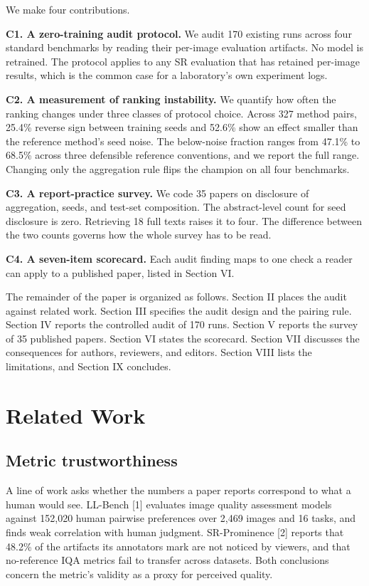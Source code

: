 \documentclass[journal,twoside,10pt]{IEEEtran}
\begin{document}
We make four contributions.

\textbf{C1. A zero-training audit protocol.} We audit 170 existing runs across four standard benchmarks by reading their per-image evaluation artifacts. No model is retrained. The protocol applies to any SR evaluation that has retained per-image results, which is the common case for a laboratory's own experiment logs.

\textbf{C2. A measurement of ranking instability.} We quantify how often the ranking changes under three classes of protocol choice. Across 327 method pairs, 25.4\% reverse sign between training seeds and 52.6\% show an effect smaller than the reference method's seed noise. The below-noise fraction ranges from 47.1\% to 68.5\% across three defensible reference conventions, and we report the full range. Changing only the aggregation rule flips the champion on all four benchmarks.

\textbf{C3. A report-practice survey.} We code 35 papers on disclosure of aggregation, seeds, and test-set composition. The abstract-level count for seed disclosure is zero. Retrieving 18 full texts raises it to four. The difference between the two counts governs how the whole survey has to be read.

\textbf{C4. A seven-item scorecard.} Each audit finding maps to one check a reader can apply to a published paper, listed in Section VI.

The remainder of the paper is organized as follows. Section II places the audit against related work. Section III specifies the audit design and the pairing rule. Section IV reports the controlled audit of 170 runs. Section V reports the survey of 35 published papers. Section VI states the scorecard. Section VII discusses the consequences for authors, reviewers, and editors. Section VIII lists the limitations, and Section IX concludes.

\section{Related Work}


\subsection{Metric trustworthiness}


A line of work asks whether the numbers a paper reports correspond to what a human would see. LL-Bench [1] evaluates image quality assessment models against 152,020 human pairwise preferences over 2,469 images and 16 tasks, and finds weak correlation with human judgment. SR-Prominence [2] reports that 48.2\% of the artifacts its annotators mark are not noticed by viewers, and that no-reference IQA metrics fail to transfer across datasets. Both conclusions concern the metric's validity as a proxy for perceived quality.
\end{document}
